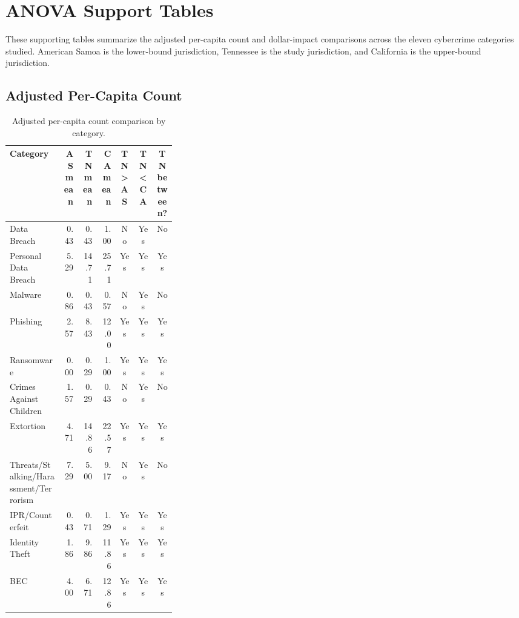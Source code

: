 
\section{ANOVA Support Tables}

These supporting tables summarize the adjusted per-capita count and dollar-impact comparisons across the eleven cybercrime categories studied. American Samoa is the lower-bound jurisdiction, Tennessee is the study jurisdiction, and California is the upper-bound jurisdiction.

\subsection{Adjusted Per-Capita Count}

\begin{table}[H]
  \centering
  \caption{Adjusted per-capita count comparison by category.}
  \label{tab:anova-count-comparison}
  \small
  \begin{tabular}{@{}p{0.32\linewidth}rrrccc@{}}
    \toprule
    Category & AS mean & TN mean & CA mean & TN > AS & TN < CA & TN between?\\
    \midrule
    Data Breach & 0.43 & 0.43 & 1.00 & No & Yes & No\\
    Personal Data Breach & 5.29 & 14.71 & 25.71 & Yes & Yes & Yes\\
    Malware & 0.86 & 0.43 & 0.57 & No & Yes & No\\
    Phishing & 2.57 & 8.43 & 12.00 & Yes & Yes & Yes\\
    Ransomware & 0.00 & 0.29 & 1.00 & Yes & Yes & Yes\\
    Crimes Against Children & 1.57 & 0.29 & 0.43 & No & Yes & No\\
    Extortion & 4.71 & 14.86 & 22.57 & Yes & Yes & Yes\\
    Threats/Stalking/Harassment/Terrorism & 7.29 & 5.00 & 9.17 & No & Yes & No\\
    IPR/Counterfeit & 0.43 & 0.71 & 1.29 & Yes & Yes & Yes\\
    Identity Theft & 1.86 & 9.86 & 11.86 & Yes & Yes & Yes\\
    BEC & 4.00 & 6.71 & 12.86 & Yes & Yes & Yes\\
    \bottomrule
  \end{tabular}
\end{table}

